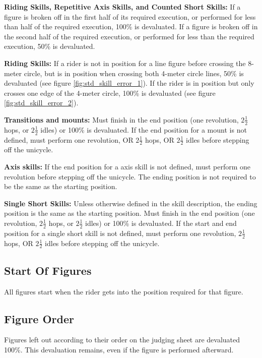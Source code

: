 \textbf{Riding Skills, Repetitive Axis Skills, and Counted Short Skills:} If a figure is broken off in the first half of its required execution, or performed for less than half of the required execution, 100\% is devaluated.
If a figure is broken off in the second half of the required execution, or performed for less than the required execution, 50\% is devaluated.

\textbf{Riding Skills:}
If a rider is not in position for a line figure before crossing the 8-meter circle, but is in position when crossing both 4-meter circle lines, 50\% is devaluated (see figure \ref{fig:std_skill_error_1}).
If the rider is in position but only crosses one edge of the 4-meter circle, 100\% is devaluated (see figure \ref{fig:std_skill_error_2}).

\textbf{Transitions and mounts:} Must finish in the end position (one revolution, $2 \frac{1}{2}$ hops, or $2 \frac{1}{2}$ idles) or 100\% is devaluated.
If the end position for a mount is not defined, must perform one revolution, OR $2 \frac{1}{2}$ hops, OR $2 \frac{1}{2}$ idles before stepping off the unicycle.

\textbf{Axis skills:} If the end position for a axis skill is not defined, must perform one revolution before stepping off the unicycle.
The ending position is not required to be the same as the starting position.

\textbf{Single Short Skills:} Unless otherwise defined in the skill description, the ending position is the same as the starting position.
Must finish in the end position (one revolution, $2 \frac{1}{2}$ hops, or $2 \frac{1}{2}$ idles) or 100\% is devaluated.
If the start and end position for a single short skill is not defined, must perform one revolution, $2 \frac{1}{2}$ hops, OR $2 \frac{1}{2}$ idles before stepping off the unicycle.

\subsection{Start Of Figures}
All figures start when the rider gets into the position required for that figure.

\subsection{Figure Order}
Figures left out according to their order on the judging sheet are devaluated 100\%.
This devaluation remains, even if the figure is performed afterward.

